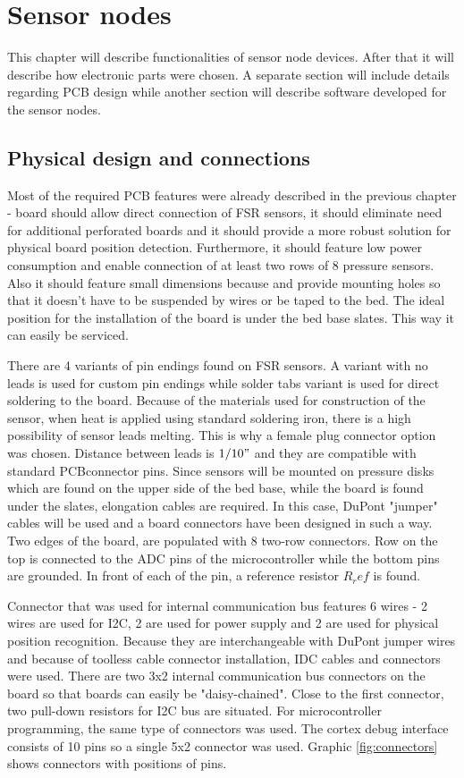\chapter{Sensor nodes}
\label{chap:nodes}

This chapter will describe functionalities of sensor node devices. After that it will describe how electronic parts were chosen. A separate section will include details regarding \ac{PCB} design while another section will describe software developed for the sensor nodes.

\section{Physical design and connections}

Most of the required \ac{PCB} features were already described in the previous chapter - board should allow direct connection of \ac{FSR} sensors, it should eliminate need for additional perforated boards and it should provide a more robust solution for physical board position detection. Furthermore, it should feature low power consumption and enable connection of at least two rows of 8 pressure sensors. Also it should feature small dimensions because and provide mounting holes so that it doesn't have to be suspended by wires or be taped to the bed. The ideal position for the installation of the board is under the bed base slates. This way it can easily be serviced.

There are 4 variants of pin endings found on \ac{FSR} sensors. A variant with no leads is used for custom pin endings while solder tabs variant is used for direct soldering to the board. Because of the materials used for construction of the sensor, when heat is applied using standard soldering iron, there is a high possibility of sensor leads melting. This is why a female plug connector option was chosen. Distance between leads is $1/10"$ and they are compatible with standard \ac{PCB}connector pins. Since sensors will be mounted on pressure disks which are found on the upper side of the bed base, while the board is found under the slates, elongation cables are required. In this case, DuPont "jumper" cables will be used and a board connectors have been designed in such a way. Two edges of the board, are populated with 8 two-row connectors. Row on the top is connected to the \ac{ADC} pins of the microcontroller while the bottom pins are grounded. In front of each of the pin, a reference resistor $R_ref$ is found.

Connector that was used for internal communication bus features 6 wires - 2 wires are used for \ac{I2C}, 2 are used for power supply and 2 are used for physical position recognition. Because they are interchangeable with DuPont jumper wires and because of toolless cable connector installation, \ac{IDC} cables and connectors were used\cite{IDC}. There are two 3x2 internal communication bus connectors on the board so that boards can easily be "daisy-chained". Close to the first connector, two pull-down resistors for I2C bus are situated. For microcontroller programming, the same type of connectors was used. The cortex debug interface consists of 10 pins so a single 5x2 connector was used. Graphic \ref{fig:connectors} shows connectors with positions of pins.

